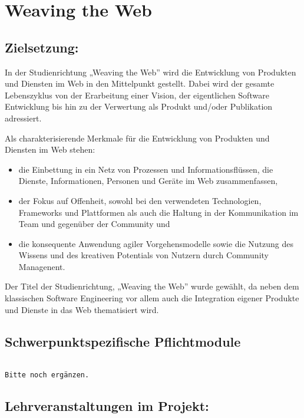 \chapter{Weaving the Web}\label{weaving-the-web}

\section*{Zielsetzung:}\label{zielsetzung-1}

In der Studienrichtung „Weaving the Web'' wird die Entwicklung von
Produkten und Diensten im Web in den Mittelpunkt gestellt. Dabei wird
der gesamte Lebenszyklus von der Erarbeitung einer Vision, der
eigentlichen Software Entwicklung bis hin zu der Verwertung als Produkt
und/oder Publikation adressiert.

Als charakterisierende Merkmale für die Entwicklung von Produkten und
Diensten im Web stehen:

\begin{itemize}
\item
  die Einbettung in ein Netz von Prozessen und Informationsflüssen, die
  Dienste, Informationen, Personen und Geräte im Web zusammenfassen,
\item
  der Fokus auf Offenheit, sowohl bei den verwendeten Technologien,
  Frameworks und Plattformen als auch die Haltung in der Kommunikation
  im Team und gegenüber der Community und
\item
  die konsequente Anwendung agiler Vorgehensmodelle sowie die Nutzung
  des Wissens und des kreativen Potentials von Nutzern durch Community
  Managenent.
\end{itemize}

Der Titel der Studienrichtung, „Weaving the Web'' wurde gewählt, da
neben dem klassischen Software Engineering vor allem auch die
Integration eigener Produkte und Dienste in das Web thematisiert wird.

\section*{Schwerpunktspezifische
Pflichtmodule}\label{schwerpunktspezifische-pflichtmodule-4}

\begin{verbatim}

Bitte noch ergänzen.
\end{verbatim}

\section*{Lehrveranstaltungen im
Projekt:}\label{lehrveranstaltungen-im-projekt-3}

